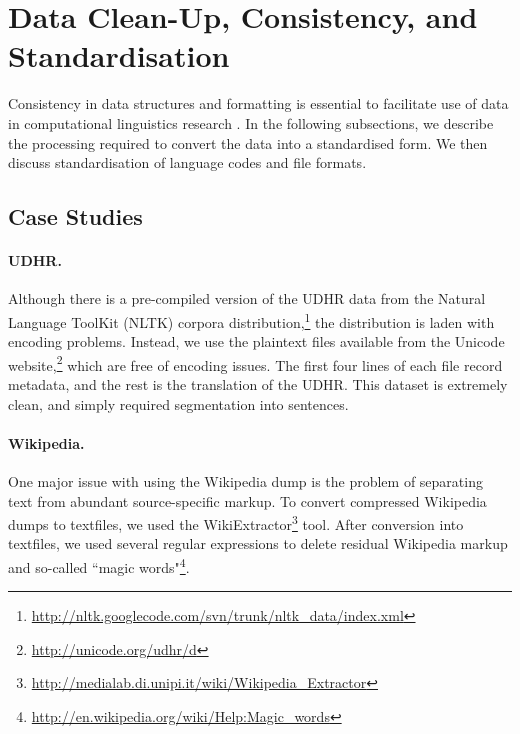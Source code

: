 \section{Data Clean-Up, Consistency, and Standardisation} \label{sec:case_studies}
Consistency in data structures and formatting is essential to facilitate use of data in computational linguistics research \cite{palmer2010lilt}. In the following subsections, we describe the processing required to convert the data into a standardised form.  We then discuss standardisation of language codes and file formats.

\subsection{Case Studies}


\paragraph{UDHR.} Although there is a pre-compiled version of the UDHR data from the
Natural Language ToolKit (NLTK) corpora
distribution,\footnote{\url{http://nltk.googlecode.com/svn/trunk/nltk_data/index.xml}}
the distribution is laden with encoding problems. 
Instead, we use the
plaintext files available from the Unicode
website,\footnote{\url{http://unicode.org/udhr/d}} which are free of
encoding issues. The first four lines of each file record metadata,
and the rest is the translation of the UDHR. This dataset is
extremely clean, and simply required segmentation into sentences.


\paragraph{Wikipedia.}
One major issue with using the Wikipedia dump is the problem of separating text from abundant source-specific markup. To convert compressed
Wikipedia dumps to textfiles, we used the WikiExtractor\footnote{\url{http://medialab.di.unipi.it/wiki/Wikipedia_Extractor}}
tool. After conversion into textfiles, we used several regular expressions to
delete residual Wikipedia markup and so-called ``magic
words"\footnote{\url{http://en.wikipedia.org/wiki/Help:Magic_words}}.


